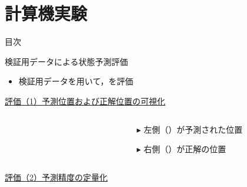 \section{計算機実験}

\begin{frame}[noframenumbering]{目次}
    \tableofcontents[currentsection]
\end{frame}

\begin{frame}{検証用データによる状態予測評価}
    \small
    \begin{itemize}
        \item 検証用データを用いて，を評価
    \end{itemize}
    \vspace{0.5zh}
    \uline{評価（1）予測位置および正解位置の可視化}
    \begin{columns}
        \begin{column}{.6\linewidth}
            \vspace{-1zh}
            \begin{figure}
            \end{figure}              
        \end{column}
        \hspace{-30pt}
        \begin{column}{.4\linewidth}
            \begin{itemize}
                \item[$\blacktriangleright$] 左側（）が予測された位置
                \item[$\blacktriangleright$] 右側（）が正解の位置
            \end{itemize}
        \end{column}
    \end{columns}
    \uline{評価（2）予測精度の定量化}
    \begin{columns}
        \begin{column}{.6\linewidth}
        \end{column}
        \hspace{-30pt}
        \begin{column}{.4\linewidth}
            \vspace{-2.5zh}
            \begin{itemize}

\end{itemize}
\end{column}
\end{columns}
\end{frame}
